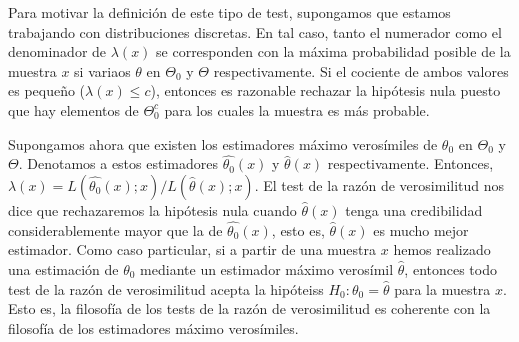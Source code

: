     Para motivar la definición de este tipo de test, supongamos que estamos trabajando con distribuciones discretas. En tal caso, tanto el numerador como el denominador de $\lambda(x)$ se corresponden con la máxima probabilidad posible de la muestra $x$ si variaos $\theta$ en $\Theta_0$ y $\Theta$ respectivamente. Si el cociente de ambos valores es pequeño ($\lambda(x) \le c$), entonces es razonable rechazar la hipótesis nula puesto que hay elementos de $\Theta_0^c$ para los cuales la muestra es más probable.

    Supongamos ahora que existen los estimadores máximo verosímiles de $\theta_0$ en $\Theta_0$ y $\Theta$. Denotamos a estos estimadores $\hat{\theta_0}(x)$ y $\hat{\theta}(x)$ respectivamente. Entonces, $\lambda(x) = L(\hat{\theta_0}(x);x) / L(\hat{\theta}(x);x)$. El test de la razón de verosimilitud nos dice que rechazaremos la hipótesis nula cuando $\hat{\theta}(x)$  tenga una credibilidad considerablemente mayor que la de $\hat{\theta_0}(x)$, esto es, $\hat{\theta}(x)$ es mucho mejor estimador. Como caso particular, si a partir de una muestra $x$ hemos realizado una estimación de $\theta_0$ mediante un estimador máximo verosímil $\hat{\theta}$, entonces todo test de la razón de verosimilitud acepta la hipóteiss $H_0: \theta_0 = \hat{\theta}$ para la muestra $x$. Esto es, la filosofía de los tests de la razón de verosimilitud es coherente con la filosofía de los estimadores máximo verosímiles.

